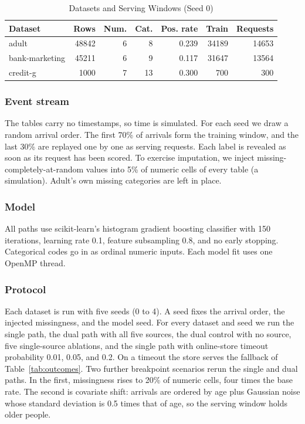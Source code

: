 \documentclass[journal]{IEEEtran}
\begin{document}
\begin{table}[!t]
\caption{Datasets and Serving Windows (Seed 0)}
\label{tab:datasets}
\centering
\footnotesize
\setlength{\tabcolsep}{3.5pt}
\begin{tabular}{@{}lrrrrrr@{}}
\toprule
Dataset & Rows & Num. & Cat. & Pos. rate & Train & Requests \\
\midrule
adult & 48842 & 6 & 8 & 0.239 & 34189 & 14653 \\
bank-marketing & 45211 & 6 & 9 & 0.117 & 31647 & 13564 \\
credit-g & 1000 & 7 & 13 & 0.300 & 700 & 300 \\
\bottomrule
\end{tabular}
\end{table}

\subsubsection{Event stream}
The tables carry no timestamps, so time is simulated. For each seed we draw a random arrival order. The first 70\% of arrivals form the training window, and the last 30\% are replayed one by one as serving requests. Each label is revealed as soon as its request has been scored. To exercise imputation, we inject missing-completely-at-random values into 5\% of numeric cells of every table (a simulation). Adult's own missing categories are left in place.

\subsubsection{Model}
All paths use scikit-learn's histogram gradient boosting classifier \cite{pedregosa2011sklearn} with 150 iterations, learning rate 0.1, feature subsampling 0.8, and no early stopping. Categorical codes go in as ordinal numeric inputs. Each model fit uses one OpenMP thread.

\subsubsection{Protocol}
Each dataset is run with five seeds (0 to 4). A seed fixes the arrival order, the injected missingness, and the model seed. For every dataset and seed we run the single path, the dual path with all five sources, the dual control with no source, five single-source ablations, and the single path with online-store timeout probability 0.01, 0.05, and 0.2. On a timeout the store serves the fallback of Table~\ref{tab:outcomes}. Two further breakpoint scenarios rerun the single and dual paths. In the first, missingness rises to 20\% of numeric cells, four times the base rate. The second is covariate shift: arrivals are ordered by age plus Gaussian noise whose standard deviation is 0.5 times that of age, so the serving window holds older people.
\end{document}
